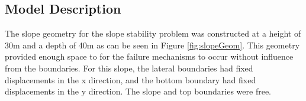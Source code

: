 \subsection{Model Description}

The slope geometry for the slope stability problem was constructed at a height of 30m and a depth of 40m as can be seen in Figure \ref{fig:slopeGeom}. This geometry provided enough space to for the failure mechanisms to occur without influence from the boundaries. For this slope, the lateral boundaries had fixed displacements in the x direction, and the bottom boundary had fixed displacements in the y direction. The slope and top boundaries were free. 
